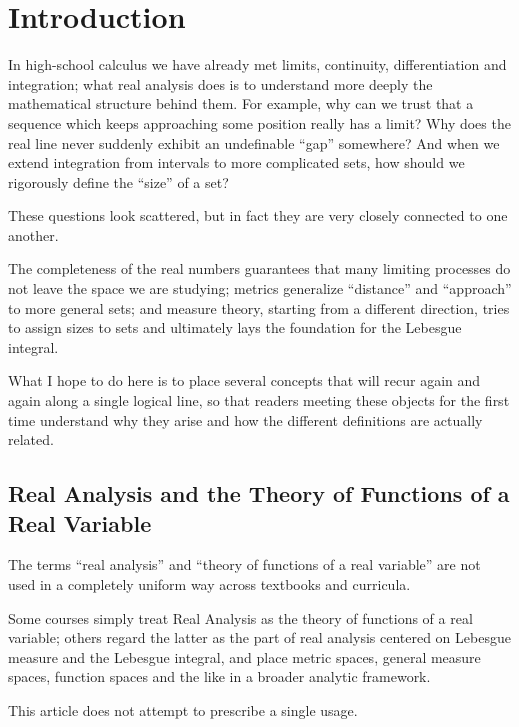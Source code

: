 \documentclass[11pt]{article}
\begin{document}
\maketitle

\section*{Introduction}

In high-school calculus we have already met limits, continuity, differentiation and integration; what real analysis does is to understand more deeply the mathematical structure behind them. For example, why can we trust that a sequence which keeps approaching some position really has a limit? Why does the real line never suddenly exhibit an undefinable ``gap'' somewhere? And when we extend integration from intervals to more complicated sets, how should we rigorously define the ``size'' of a set?

These questions look scattered, but in fact they are very closely connected to one another.

The completeness of the real numbers guarantees that many limiting processes do not leave the space we are studying; metrics generalize ``distance'' and ``approach'' to more general sets; and measure theory, starting from a different direction, tries to assign sizes to sets and ultimately lays the foundation for the Lebesgue integral.

What I hope to do here is to place several concepts that will recur again and again along a single logical line, so that readers meeting these objects for the first time understand why they arise and how the different definitions are actually related.

\subsection*{Real Analysis and the Theory of Functions of a Real Variable}

The terms ``real analysis'' and ``theory of functions of a real variable'' are not used in a completely uniform way across textbooks and curricula.

Some courses simply treat Real Analysis as the theory of functions of a real variable; others regard the latter as the part of real analysis centered on Lebesgue measure and the Lebesgue integral, and place metric spaces, general measure spaces, function spaces and the like in a broader analytic framework.

This article does not attempt to prescribe a single usage.
\end{document}
